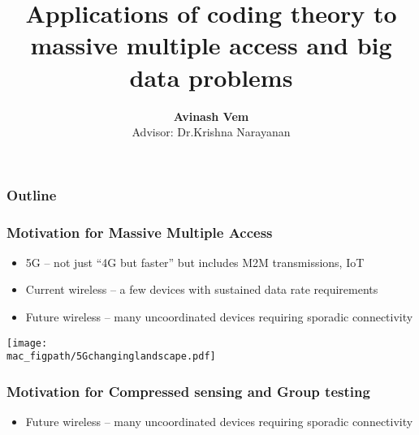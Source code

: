 \documentclass[10pt]{beamer}
\def\mac_figpath{../Figures/MAC}
\begin{document}
\title{\bf Applications of coding theory to massive multiple access and big data problems}
\author{\textbf{Avinash Vem}\\ \vspace{3pt} \small Advisor: Dr.Krishna Narayanan} 
\vspace{10pt}
\date{} %


\frame{\titlepage}
\begin{frame}
	\frametitle{Outline}
	\tableofcontents
\end{frame}

\begin{frame}
\frametitle{Motivation for Massive Multiple Access}

\begin{itemize}
\item 5G -- not just ``4G but faster'' but includes M2M transmissions, IoT
\item Current wireless -- a few devices with sustained data rate requirements
\item Future wireless -- {\color{blue}many uncoordinated} devices requiring {\color{blue}sporadic connectivity}
\end{itemize}

\begin{center}
\texttt{[image: \\mac\_figpath/5Gchanginglandscape.pdf]}
\end{center}
\end{frame}

\begin{frame}
\frametitle{Motivation for Compressed sensing and Group testing}

\begin{itemize}
\item Future wireless -- {\color{blue}many uncoordinated} devices requiring {\color{blue}sporadic connectivity}
\end{itemize}

\begin{center}
\end{center}
\end{frame}
\end{document}

